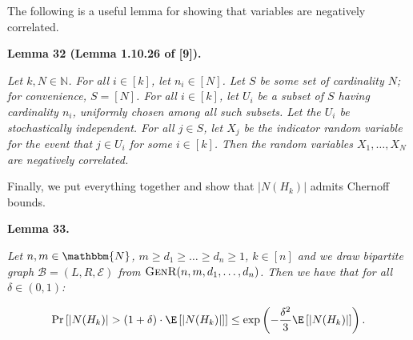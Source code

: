 \documentclass[10pt,a4paper]{article}
\begin{document}



The following is a useful lemma for showing that variables are negatively correlated.\par





\par\medskip\noindent\textbf{\textbf{Lemma 32}\textbf{ }(Lemma 1.10.26 of [9])\textbf{.}}\par



\emph{Let $k,N\in\mathbb{N}$. For all $i\in[k]$, let $n_{i}\in[N]$.
Let $S$ be some set of cardinality $N$; for convenience, $S=[N]$.
For all $i\in[k]$, let $U_{i}$ be a subset of $S$ having cardinality $n_{i}$, uniformly chosen among all such subsets.
Let the $U_{i}$ be stochastically independent.
For all $j\in S$, let $X_{j}$ be the indicator random variable for the event that $j\in U_{i}$ for some $i\in[k]$.
Then the random variables $X_{1},\dots,X_{N}$ are negatively correlated.}\par






Finally, we put everything together and show that $|N(H_{k})|$ admits Chernoff bounds.\par





\par\medskip\noindent\textbf{\textbf{Lemma 33}\textbf{.}}\par



\emph{Let $n,m\in\mathbbm{N}$, $m\geq d_{1}\geq\dots\geq d_{n}\geq 1$, $k\in[n]$ and we draw bipartite graph $\mathcal{B}=(L,R,\mathcal{E})$ from $\textsc{GenR}(n,m,d_{1},\dots,d_{n})$.
Then we have that for all $\delta\in(0,1)$:}\par


\[\begin{gathered}
\displaystyle\Pr\left[|N(H_{k})|>(1+\delta)\cdot\E\left[|N(H_{k})|\right]\right]\leq\exp\left(-\frac{\delta^{2}}{3}\E\left[|N(H_{k})|\right]\right).
\end{gathered}\]



\end{document}
